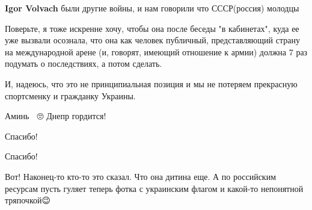 \begin{itemize}
\begin{itemize}
\textbf{Igor Volvach} были другие войны, и нам говорили что СССР(россия) молодцы

 

Поверьте, я тоже искренне хочу, чтобы она после беседы "в кабинетах", куда ее
уже вызвали осознала, что она как человек публичный, представляющий страну на
международной арене (и, говорят, имеющий отношение к армии) должна 7 раз
подумать о последствиях, а потом сделать.

И, надеюсь, что это не принципиальная позиция и мы не потеряем прекрасную
спортсменку и гражданку Украины.

\end{itemize}

 
Аминь 🙌 🙄
Днепр гордится!

 
Спасибо!

 
Спасибо!

 

Вот! Наконец-то кто-то это сказал. Что она дитина еще. А по российским ресурсам
пусть гуляет теперь фотка с украинским флагом и какой-то непонятной тряпочкой😉


 

\end{itemize}
